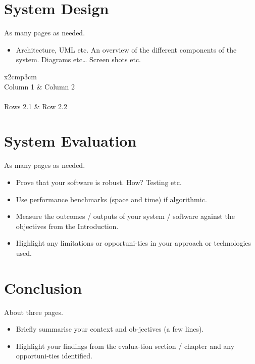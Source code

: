\chapter{System Design}	%
As many pages as needed.
\begin{itemize}
\item Architecture, UML etc. An overview of the different components of the system. Diagrams etc… Screen shots etc.
\end{itemize}

\begin{table}[h]
  \centering
  \begin{tabular}{x{2cm}p{3cm}}
    \toprule \\
    Column 1 & Column 2 \\
    \midrule \\
    Rows 2.1 & Row 2.2 \\
    \bottomrule
  \end{tabular}
  \caption{A table.}
  \label{table:mytable}
\end{table}

\chapter{System Evaluation}	%
As many pages as needed.
\begin{itemize}
\item Prove that your software is robust. How? Testing etc. 
\item Use performance benchmarks (space and time) if algorithmic.
\item Measure the outcomes / outputs of your system / software against the objectives from the Introduction.
\item Highlight any limitations or opportuni-ties in your approach or technologies used.
\end{itemize}

\chapter{Conclusion}	%
About three pages.

\begin{itemize}
\item Briefly summarise your context and ob-jectives (a few lines).
\item Highlight your findings from the evalua-tion section / chapter and any opportuni-ties identified.
\end{itemize}

